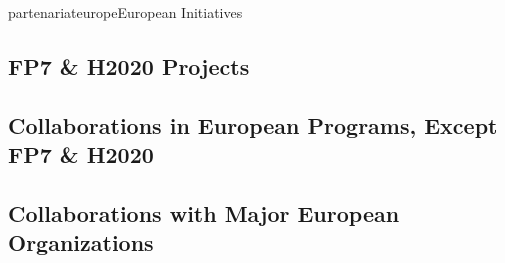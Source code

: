 \documentclass{ra2018}
\begin{document}
\begin{module}{partenariat}{europe}{European Initiatives}

\subsection{FP7 \& H2020 Projects}


%




\subsection{Collaborations in European Programs, Except FP7 \& H2020}



\subsection{Collaborations with Major European Organizations}



\end{module}
\end{document}
